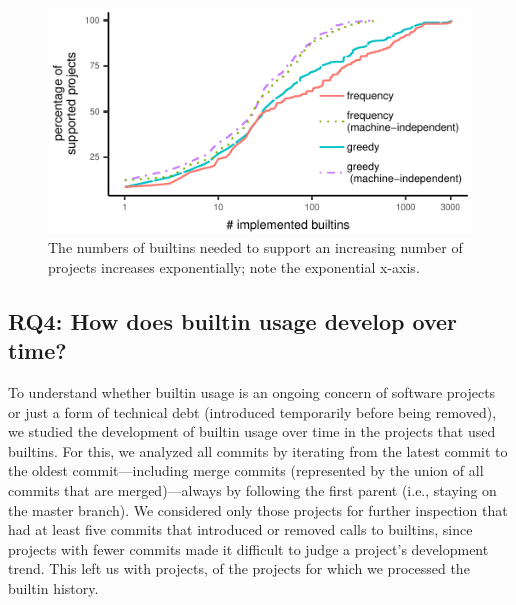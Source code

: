 \documentclass[sigconf,screen]{acmart}
\begin{document}
\begin{figure}[tb]
    \centering
    \includegraphics[width=\columnwidth]{../generated/plots/implementation.pdf}
    \caption{The numbers of builtins needed to support an increasing number of projects increases exponentially; note the exponential x-axis.}
    \label{img:implementationeffort}
\end{figure}

\begin{table}
    \footnotesize
    \smallbuiltintable{}
\end{table}

\subsection{RQ4: How does builtin usage develop over time?}

To understand whether builtin usage is an ongoing concern of software projects or just a form of technical debt (introduced temporarily before being removed), we studied the development of builtin usage over time in the projects that used builtins. For this, we analyzed all commits by iterating from the latest commit to the oldest commit---including merge commits (represented by the union of all commits that are merged)---always by following the first parent (i.e., staying on the master branch).
We considered only those projects for further inspection that had at least five commits that introduced or removed calls to builtins, since projects with fewer commits made it difficult to judge a project's development trend.
This left us with \nrnotautomatic{} projects, \percentagenotautomatic{} of the projects for which we processed the builtin history.
\end{document}
